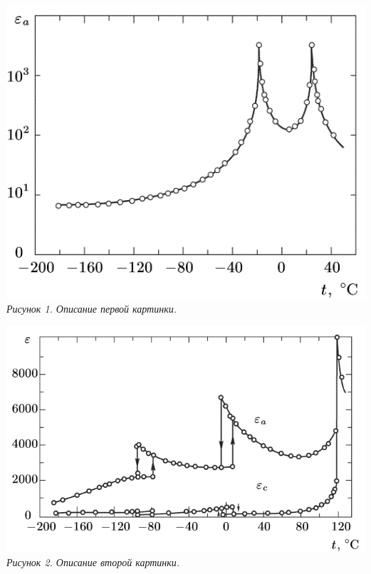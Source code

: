 \documentclass[12pt]{article}
\begin{document}
\begin{minipage}{0.45\textwidth} %
    \centering
    \includegraphics[width=\textwidth]{2.png}
    \textit{Рисунок 1. Описание первой картинки.}
\end{minipage}
\hfill
\begin{minipage}{0.45\textwidth} %
    \centering
    \includegraphics[width=\textwidth]{1.png}
    \textit{Рисунок 2. Описание второй картинки.}
\end{minipage}
\end{document}
